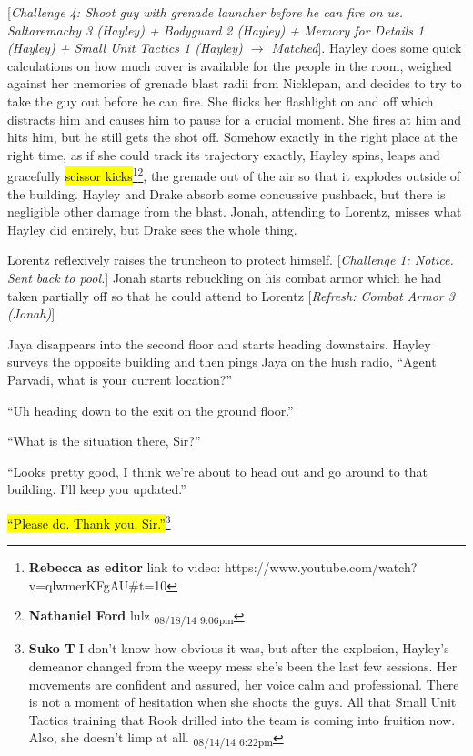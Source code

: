 {[}\textit{Challenge 4: Shoot guy with grenade launcher before he can fire on us.  Saltaremachy 3 (Hayley) + Bodyguard 2 (Hayley) + Memory for Details 1 (Hayley) + Small Unit Tactics 1 (Hayley) $\rightarrow$ Matched}{]}.  Hayley does some quick calculations on how much cover is available for the people in the room, weighed against her memories of grenade blast radii from Nicklepan, and decides to try to take the guy out before he can fire.  She flicks her flashlight on and off which distracts him and causes him to pause for a crucial moment.  She fires at him and hits him, but he still gets the shot off.  Somehow exactly in the right place at the right time, as if she could track its trajectory exactly, Hayley spins, leaps and gracefully \hl{scissor kicks}\footnote{\textbf{Rebecca as editor} link to video: https://www.youtube.com/watch?v=qlwmerKFgAU\#t=10}\footnote{\textbf{Nathaniel Ford }lulz \textsubscript{08/18/14 9:06pm}}, the grenade out of the air so that it explodes outside of the building.  Hayley and Drake absorb some concussive pushback, but there is negligible other damage from the blast.  Jonah, attending to Lorentz, misses what Hayley did entirely, but Drake sees the whole thing.



Lorentz reflexively raises the truncheon to protect himself.  {[}\textit{Challenge 1: Notice. Sent back to pool.}{]}  Jonah starts rebuckling on his combat armor which he had taken partially off so that he could attend to Lorentz {[}\textit{Refresh: Combat Armor 3 (Jonah)}{]}



Jaya disappears into the second floor and starts heading downstairs.  Hayley surveys the opposite building and then pings Jaya on the hush radio, ``Agent Parvadi, what is your current location?''

``Uh heading down to the exit on the ground floor.''

``What is the situation there, Sir?''

``Looks pretty good, I think we're about to head out and go around to that building.  I'll keep you updated.''

\hl{``Please do. Thank you, Sir.''}\footnote{\textbf{Suko T }I don't know how obvious it was, but after the explosion, Hayley's demeanor changed from the weepy mess she's been the last few sessions.  Her movements are confident and assured, her voice calm and professional.  There is not a moment of hesitation when she shoots the guys.  All that Small Unit Tactics training that Rook drilled into the team is coming into fruition now.  Also, she doesn't limp at all. \textsubscript{08/14/14 6:22pm}}



